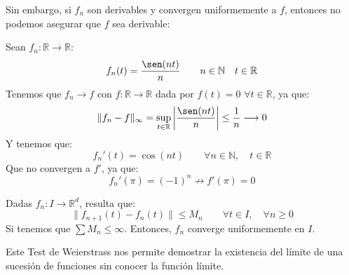 Sin embargo, si $f_n$ son derivables y convergen uniformemente a $f$, entonces no podemos asegurar que $f$ sea derivable:
\begin{ejemplo}
    Sean $f_n:\mathbb{R}\rightarrow\mathbb{R}$:
    \begin{equation*}
        f_n(t) = \dfrac{\sen(nt)}{n} \qquad n\in \mathbb{N} \quad t\in \mathbb{R}
    \end{equation*}
    Tenemos que $f_n\rightarrow f$ con $f:\mathbb{R}\rightarrow\mathbb{R}$ dada por $f(t) = 0$ $\forall t\in \mathbb{R}$, ya que:
    \begin{equation*}
        \|f_n - f\|_\infty = \sup_{t\in \mathbb{R}} \left|\dfrac{\sen(nt)}{n}\right| \leq \dfrac{1}{n} \longrightarrow 0
    \end{equation*}
    Y tenemos que:
    \begin{equation*}
        f_n'(t) = \cos(nt) \qquad \forall n\in \mathbb{N}, \quad t\in \mathbb{R}
    \end{equation*}
    Que no convergen a $f'$, ya que:
    \begin{equation*}
        f_n'(\pi) = {(-1)}^{n} \not\rightarrow f'(\pi) = 0
    \end{equation*}
\end{ejemplo}

\begin{prop}
    Dadas $f_n:I\rightarrow\mathbb{R}^d$, resulta que:
    \begin{equation*}
        \|f_{n+1}(t) - f_n(t)\| \leq M_n \qquad \forall t\in I, \quad \forall n\geq 0
    \end{equation*}
    Si tenemos que $\sum M_n \leq \infty$. Entonces, $f_n$ converge uniformemente en $I$.
\end{prop}
Este Test de Weierstrass nos permite demostrar la existencia del límite de una sucesión de funciones sin conocer la función límite.

